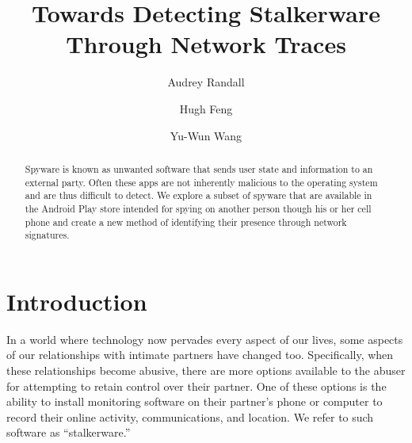 \documentclass[acmtog]{acmart}
\begin{document}
\title{Towards Detecting Stalkerware Through Network Traces}


\author{Audrey Randall}
\author{Hugh Feng}
\author{Yu-Wun Wang}

\begin{abstract}
Spyware is known as unwanted software that sends user state and information to 
an external party. Often these apps are not inherently malicious to the 
operating system and are thus difficult to detect. We explore a subset of 
spyware that are available in the Android Play store intended for spying on 
another person though his or her cell phone and create a new method of 
identifying their presence through network signatures.  
\end{abstract}

\maketitle

\section{Introduction}
In a world where technology now pervades every aspect of our lives, some 
aspects of our relationships with intimate partners have changed too. 
Specifically, when these relationships become abusive, there are more options 
available to the abuser for attempting to retain control over their partner. 
One of these options is the ability to install monitoring software on their 
partner's phone or computer to record their online activity, communications, 
and location. We refer to such software as ``stalkerware.''  
\end{document}
